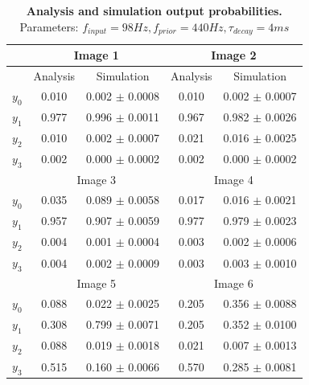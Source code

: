 \begin{table}[]
\label{tab:doubleSize_98_440_4}
\small
\tabcolsep=0.11cm
\begin{tabular}{|c|cc|cc|}
\hline
                       & \multicolumn{2}{c|}{Image 1}                       & \multicolumn{2}{c|}{Image 2}                       \\ \hline
                       & \multicolumn{1}{c|}{Analysis} & Simulation         & \multicolumn{1}{c|}{Analysis} & Simulation         \\ \hline
$y_0$                  & \multicolumn{1}{c|}{0.010}    & 0.002 $\pm$ 0.0008 & \multicolumn{1}{c|}{0.010}    & 0.002 $\pm$ 0.0007 \\ \hline
$y_1$                  & \multicolumn{1}{c|}{0.977}    & 0.996 $\pm$ 0.0011 & \multicolumn{1}{c|}{0.967}    & 0.982 $\pm$ 0.0026 \\ \hline
$y_2$                  & \multicolumn{1}{c|}{0.010}    & 0.002 $\pm$ 0.0007 & \multicolumn{1}{c|}{0.021}    & 0.016 $\pm$ 0.0025 \\ \hline
$y_3$                  & \multicolumn{1}{c|}{0.002}    & 0.000 $\pm$ 0.0002 & \multicolumn{1}{c|}{0.002}    & 0.000 $\pm$ 0.0002 \\ \hline
                       & \multicolumn{2}{c|}{Image 3}                       & \multicolumn{2}{c|}{Image 4}                       \\ \hline
$y_0$                  & \multicolumn{1}{c|}{0.035}    & 0.089 $\pm$ 0.0058 & \multicolumn{1}{c|}{0.017}    & 0.016 $\pm$ 0.0021 \\ \hline
$y_1$                  & \multicolumn{1}{c|}{0.957}    & 0.907 $\pm$ 0.0059 & \multicolumn{1}{c|}{0.977}    & 0.979 $\pm$ 0.0023 \\ \hline
$y_2$                  & \multicolumn{1}{c|}{0.004}    & 0.001 $\pm$ 0.0004 & \multicolumn{1}{c|}{0.003}    & 0.002 $\pm$ 0.0006 \\ \hline
$y_3$                  & \multicolumn{1}{c|}{0.004}    & 0.002 $\pm$ 0.0009 & \multicolumn{1}{c|}{0.003}    & 0.003 $\pm$ 0.0010 \\ \hline
						& \multicolumn{2}{c|}{Image 5}                       & \multicolumn{2}{c|}{Image 6}                       \\ \hline
$y_0$                  & \multicolumn{1}{c|}{0.088}    & 0.022 $\pm$ 0.0025 & \multicolumn{1}{c|}{0.205}    & 0.356 $\pm$ 0.0088 \\ \hline
$y_1$                  & \multicolumn{1}{c|}{0.308}    & 0.799 $\pm$ 0.0071 & \multicolumn{1}{c|}{0.205}    & 0.352 $\pm$ 0.0100 \\ \hline
$y_2$                  & \multicolumn{1}{c|}{0.088}    & 0.019 $\pm$ 0.0018 & \multicolumn{1}{c|}{0.021}    & 0.007 $\pm$ 0.0013 \\ \hline
$y_3$                  & \multicolumn{1}{c|}{0.515}    & 0.160 $\pm$ 0.0066 & \multicolumn{1}{c|}{0.570}    & 0.285 $\pm$ 0.0081 \\ \hline
\end{tabular}
\caption{\textbf{Analysis and simulation output probabilities. } Parameters: $f_{input} = 98 Hz, f_{prior} = 440 Hz, \tau_{decay} = 4 ms$}
\end{table}

